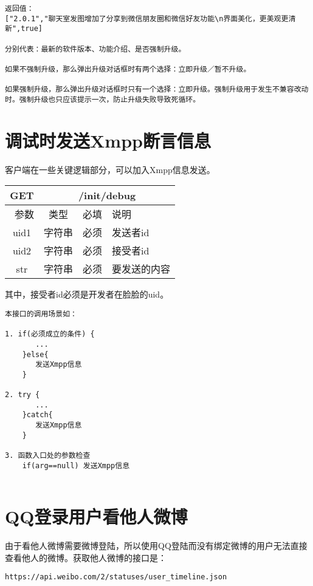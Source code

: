 \documentclass[cs4size]{ctexartutf8}
\begin{document}
\begin{verbatim}
返回值：
["2.0.1","聊天室发图增加了分享到微信朋友圈和微信好友功能\n界面美化，更美观更清新",true]

分别代表：最新的软件版本、功能介绍、是否强制升级。

如果不强制升级，那么弹出升级对话框时有两个选择：立即升级／暂不升级。

如果强制升级，那么弹出升级对话框时只有一个选择：立即升级。强制升级用于发生不兼容改动时。强制升级也只应该提示一次，防止升级失败导致死循环。
\end{verbatim}



\section{调试时发送Xmpp断言信息}

客户端在一些关键逻辑部分，可以加入Xmpp信息发送。
\begin{table}[H]
   \begin{center}
\begin{tabular}{|c|c|c|p{12cm}|}
\hline
GET & \multicolumn{3}{|c|}{/init/debug} \\
\hline\hline
 \  参数  & 类型 & 必填 &  说明  \\
 \hline
 uid1  & 字符串 & 必须 &  发送者id\\
 \hline
 uid2  & 字符串 & 必须 &  接受者id\\ 
 \hline
 str  & 字符串 & 必须 &  要发送的内容\\
\hline
\end{tabular}
   \end{center}
\end{table}
其中，接受者id必须是开发者在脸脸的uid。

\begin{verbatim}
本接口的调用场景如：

1. if(必须成立的条件) {
       ...
    }else{
       发送Xmpp信息
    }

2. try {
       ...
    }catch{
       发送Xmpp信息
    }

3. 函数入口处的参数检查
    if(arg==null) 发送Xmpp信息
    
\end{verbatim}







\section{QQ登录用户看他人微博}
由于看他人微博需要微博登陆，所以使用QQ登陆而没有绑定微博的用户无法直接查看他人的微博。获取他人微博的接口是：
\begin{verbatim}
https://api.weibo.com/2/statuses/user_timeline.json
\end{verbatim}
\end{document}
